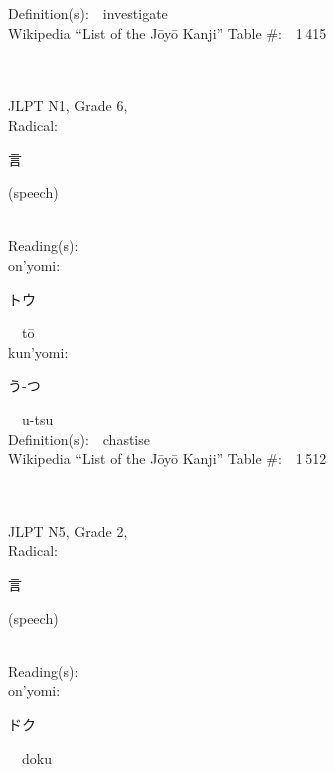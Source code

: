 \begin{multicols}{2}
Definition(s):\ \ investigate \\
Wikipedia ``List of the J\=oy\=o Kanji'' Table \#:\ \ 1\,415 \\
\ \ \\
{\fontsize{34pt}{40pt}  }\ \ \\  %
{JLPT N1, Grade 6, \\Radical:\ \ {\begin{CJK}{UTF8}{min} 言 \end{CJK}} (speech) } \\
Reading(s):\ \ \\
{\hspace*{1em}}on'yomi:\ \ \\
{\hspace*{2em}}{\begin{CJK}{UTF8}{min} トウ \end{CJK}}\ \ t\=o\ \ \\
{\hspace*{1em}}kun'yomi:\ \ \\
{\hspace*{2em}}{\begin{CJK}{UTF8}{min} う-つ \end{CJK}}\ \ u-tsu\ \ \\
Definition(s):\ \ chastise \\
Wikipedia ``List of the J\=oy\=o Kanji'' Table \#:\ \ 1\,512 \\
\ \ \\
{\fontsize{34pt}{40pt}  }\ \ \\  %
{JLPT N5, Grade 2, \\Radical:\ \ {\begin{CJK}{UTF8}{min} 言 \end{CJK}} (speech) } \\
Reading(s):\ \ \\
{\hspace*{1em}}on'yomi:\ \ \\
{\hspace*{2em}}{\begin{CJK}{UTF8}{min} ドク \end{CJK}}\ \ doku\ \ \\

\end{multicols}
